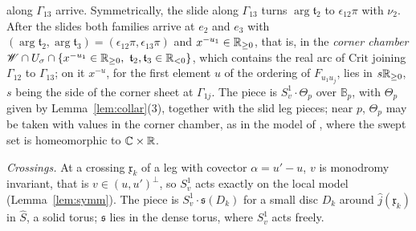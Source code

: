 along $\Gamma_{13}$ arrive. Symmetrically, the slide along $\Gamma_{13}$ turns $\arg\mathfrak t_2$ to $\epsilon_{12}\pi$ with
$\nu_2$. After the slides both families arrive at $e_2$ and $e_3$ with $(\arg\mathfrak t_2,\arg\mathfrak
t_3)=(\epsilon_{12}\pi,\epsilon_{13}\pi)$ and $x^{-u_1}\in\mathbb R_{\ge0}$, that is, in the \emph{corner chamber}
$\mathscr W\cap U_\sigma\cap\{x^{-u_1}\in\mathbb R_{\ge0},\ \mathfrak t_2,\mathfrak t_3\in\mathbb R_{<0}\}$, which contains the real arc of $\mathrm{Crit}$
joining $\Gamma_{12}$ to $\Gamma_{13}$; on it $x^{-u}$, for the first element $u$ of the ordering of $F_{u_1u_j}$, lies in
$s\mathbb R_{\ge0}$, $s$ being the side of the corner sheet at $\Gamma_{1j}$. The piece is $S^1_v\cdot\Theta_p$ over
$\mathbb B_p$, with $\Theta_p$ given by Lemma~\ref{lem:collar}(3), together with the slid leg pieces; near $p$, $\Theta_p$ may be
taken with values in the corner chamber, as in the model of \cite[\S7.4]{CBM}, where the swept set is homeomorphic to
$\mathbb C\times\mathbb R$.

\emph{Crossings.} At a crossing $\mathfrak x_k$ of a leg with covector $\alpha=u'-u$, $v$ is monodromy invariant, that is
$v\in(u,u')^\perp$, so $S^1_v$ acts exactly on the local model (Lemma~\ref{lem:symm}). The piece is $S^1_v\cdot\mathfrak s(D_k)$ for a
small disc $D_k$ around $\hat j(\mathfrak x_k)$ in $\hat S$, a solid torus; $\mathfrak s$ lies in the dense torus, where $S^1_v$ acts
freely.

